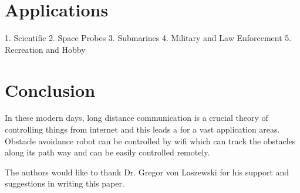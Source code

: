\documentclass[sigconf]{acmart}
\begin{document}
\section{Applications}
1. Scientific
2. Space Probes
3. Submarines
4. Military and Law Enforcement
5. Recreation and Hobby

\section{Conclusion}
In these modern days, long distance communication is a crucial theory of controlling things from internet and this leads a for a vast application areas. Obstacle avoidance robot can be controlled by wifi which can track the obstacles along its path way and can be easily controlled remotely.

\begin{acks}

The authors would like to thank Dr. Gregor von Laszewski for his support and suggestions in writing this paper.

\end{acks}


 
\end{document}

